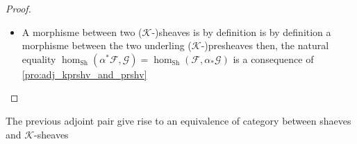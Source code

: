 \begin{proof}
\begin{itemize}
        \item A morphisme between two ($\mathcal{K}$-)sheaves is by definition is by definition a morphisme between the two underling ($\mathcal{K}$-)presheaves then, the natural equality $\hom_{\text{Sh}}(\alpha^*\mathcal{F},\mathcal{G})=\hom_{\text{Sh}}(\mathcal{F},\alpha_*\mathcal{G})$ is a consequence of \ref{pro:adj_kprshv_and_prshv}
    \end{itemize}
\end{proof}





\begin{lemma}\label{lem:kshv_equiv_shv}
    The previous adjoint pair give rise to an equivalence of category between shaeves and $\mathcal{K}$-sheaves
\end{lemma}

